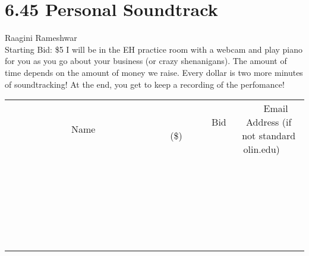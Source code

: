 \documentclass[11pt]{article}
\begin{document}
\section*{6.45 Personal Soundtrack}
Raagini Rameshwar
\\
Starting Bid: \$5
\newline
I will be in the EH practice room with a webcam and play piano for you as you go about your business (or crazy shenanigans). The amount of time depends on the amount of money we raise. Every dollar is two more minutes of soundtracking! At the end, you get to keep a recording of the perfomance!
\\[6ex]
\begin{tabular}{c c c}
~~~~~~~~~~~~~Name~~~~~~~~~~~~~ & ~~~~~~~~~Bid (\$)~~~~~~~~~  & ~~~Email Address (if not standard olin.edu)~~~\\
 & & \\
\hline
 & & \\
\hline
 & & \\
\hline
 & & \\
\hline
 & & \\
\hline
 & & \\
\hline
 & & \\
\hline
 & & \\
\hline
 & & \\
\hline
 & & \\
\hline
 & & \\
\hline
 & & \\
\hline
 & & \\
\hline
 & & \\
\hline
 & & \\
\hline
 & & \\
\hline
 & & \\
\hline
 & & \\
\hline
 & & \\
\hline
 & & \\
\hline
 & & \\
\hline
 & & \\
\hline
 & & \\
\hline
 & & \\
\hline
 & & \\
\hline
 & & \\
\hline
\end{tabular}
\newpage
\end{document}
